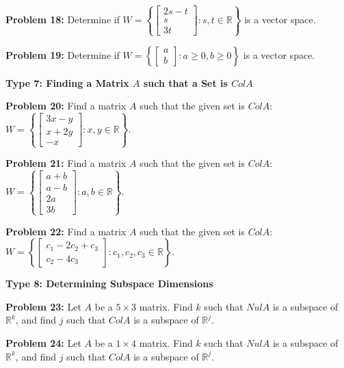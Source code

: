 \documentclass[11pt]{article}
\begin{document}
\noindent \textbf{Problem 18:} Determine if $W = \left\{ \begin{bmatrix} 2s - t \\ s \\ 3t \end{bmatrix} : s, t \in \mathbb{R} \right\}$ is a vector space.

\noindent \textbf{Problem 19:} Determine if $W = \left\{ \begin{bmatrix} a \\ b \end{bmatrix} : a \ge 0, b \ge 0 \right\}$ is a vector space.

\vspace{0.5cm}
\noindent \textbf{Type 7: Finding a Matrix $A$ such that a Set is $Col A$}

\noindent \textbf{Problem 20:} Find a matrix $A$ such that the given set is $Col A$: $W = \left\{ \begin{bmatrix} 3x - y \\ x + 2y \\ -x \end{bmatrix} : x, y \in \mathbb{R} \right\}$.

\noindent \textbf{Problem 21:} Find a matrix $A$ such that the given set is $Col A$: $W = \left\{ \begin{bmatrix} a+b \\ a-b \\ 2a \\ 3b \end{bmatrix} : a, b \in \mathbb{R} \right\}$.

\noindent \textbf{Problem 22:} Find a matrix $A$ such that the given set is $Col A$: $W = \left\{ \begin{bmatrix} c_1 - 2c_2 + c_3 \\ c_2 - 4c_3 \end{bmatrix} : c_1, c_2, c_3 \in \mathbb{R} \right\}$.

\vspace{0.5cm}
\noindent \textbf{Type 8: Determining Subspace Dimensions}

\noindent \textbf{Problem 23:} Let $A$ be a $5 \times 3$ matrix. Find $k$ such that $Nul A$ is a subspace of $\mathbb{R}^k$, and find $j$ such that $Col A$ is a subspace of $\mathbb{R}^j$.

\noindent \textbf{Problem 24:} Let $A$ be a $1 \times 4$ matrix. Find $k$ such that $Nul A$ is a subspace of $\mathbb{R}^k$, and find $j$ such that $Col A$ is a subspace of $\mathbb{R}^j$.
\end{document}
